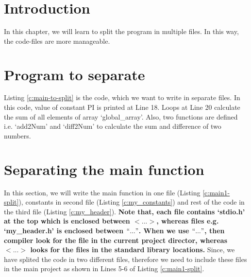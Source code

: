 \section{Introduction}
In this chapter, we will learn to split the program in multiple files. In this way, the code-files are more manageable. 

\section{Program to separate}

Listing \ref{c:main-to-split} is the code, which we want to write in separate files. In this code, value of constant PI is printed at Line 18. Loops at Line 20 calculate the sum of all elements of array `global\_array'. Also, two functions are defined i.e. `add2Num' and `diff2Num' to calculate the sum and difference of two numbers. 



\section{Separating the main function }
In this section, we will write the main function in one file (Listing \ref{c:main1-split}), constants in second file (Listing \ref{c:my_constants}) and rest of the code in the third file (Listing \ref{c:my_header}). \textbf{Note that, each file contains `stdio.h' at the top which is enclosed between $<...>$, whereas files e.g. `my\_header.h' is enclosed between $``... "$. When we use $ ``..." $, then compiler look for the file in the current project director, whereas $ <...>$ looks for the files in the standard library locations. } Since, we have splited the code in two different files, therefore we need to include these files in the main project as shown in Lines 5-6 of Listing \ref{c:main1-split}. 







